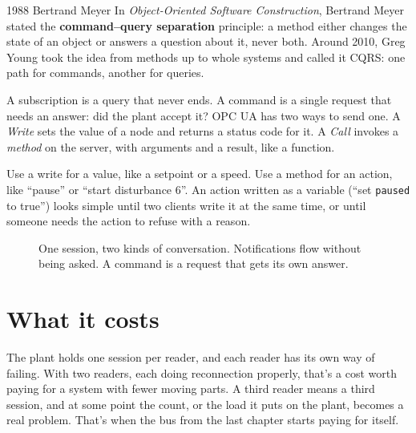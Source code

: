 \begin{history}{1988 \textperiodcentered{} Bertrand Meyer}
In \emph{Object-Oriented Software Construction}, Bertrand Meyer stated the
\textbf{command--query separation} principle: a method either changes the state
of an object or answers a question about it, never both. Around 2010, Greg
Young took the idea from methods up to whole systems and called it CQRS: one
path for commands, another for queries.
\end{history}

A subscription is a query that never ends. A command is a single request that
needs an answer: did the plant accept it? OPC UA has two ways to send one. A
\emph{Write} sets the value of a node and returns a status code for it. A
\emph{Call} invokes a \emph{method} on the server, with arguments and a result,
like a function.

Use a write for a value, like a setpoint or a speed. Use a method for an
action, like ``pause'' or ``start disturbance 6''. An action written as a
variable (``set \texttt{paused} to true'') looks simple until two clients write
it at the same time, or until someone needs the action to refuse with a reason.

\begin{figure}[htbp]
\centering
{}
\caption{One session, two kinds of conversation. Notifications flow without
being asked. A command is a request that gets its own answer.}
\end{figure}

\section{What it costs}

The plant holds one session per reader, and each reader has its own way of
failing. With two readers, each doing reconnection properly, that's a cost
worth paying for a system with fewer moving parts. A third reader means a third
session, and at some point the count, or the load it puts on the plant, becomes
a real problem. That's when the bus from the last chapter starts paying for
itself.


